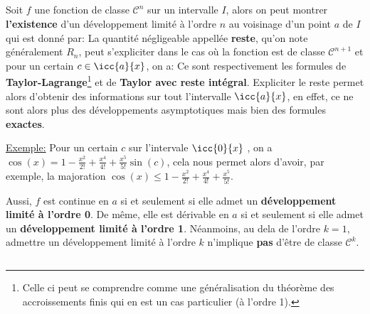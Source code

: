 \subsection*{}
Soit \(f\) une fonction de classe \(\mathscr{C}^n\) sur un intervalle \(I\), alors on peut montrer \textbf{l'existence} d'un développement limité à l'ordre \(n\) au voisinage d'un point \(a\) de \(I\) qui est donné par:
La quantité négligeable appellée \textbf{reste}, qu'on note généralement \(R_n\), peut s'expliciter dans le cas où la fonction est de classe \(\mathscr{C}^{n+1}\) et pour un certain \(c \in \icc{a}{x}\), on a:
Ce sont respectivement les formules de \textbf{Taylor-Lagrange}\footnote[1]{Celle ci peut se comprendre comme une généralisation du théorème des accroissements finis qui en est un cas particulier (à l'ordre 1).} et de \textbf{Taylor avec reste intégral}.\+
Expliciter le reste permet alors d'obtenir des informations sur tout l'intervalle \(\icc{a}{x}\), en effet, ce ne sont alors plus des développements asymptotiques mais bien des formules \textbf{exactes}.\<

\underline{Exemple:} Pour un certain \(c\) sur l'intervale \(\icc{0}{x}\) , on a \(\cos(x) = 1 - \frac{x^2}{2!} + \frac{x^4}{4!} + \frac{x^5}{5!}\sin(c)\), cela nous permet alors d'avoir, par exemple, la majoration \(\cos(x) \leq 1 - \frac{x^2}{2!} + \frac{x^4}{4!} + \frac{x^5}{5!}\).
\<


Aussi, \(f\) est continue en \(a\) si et seulement si elle admet un \textbf{développement limité à l'ordre 0}.\+
De même, elle est dérivable en \(a\) si et seulement si elle admet un \textbf{développement limité à l'ordre 1}.\+
Néanmoins, au dela de l'ordre \(k = 1\), admettre un développement limité à l'ordre \(k\) n'implique \textbf{pas} d'être de classe \(\mathscr{C}^k\).

\subsection*{}

